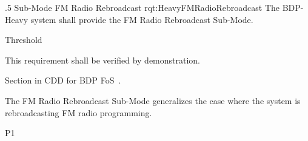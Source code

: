 \ONERQMTVKPP
{\RqtNumberBase.5}
{Sub-Mode FM Radio Rebroadcast}
{rqt:HeavyFMRadioRebroadcast}
{The BDP-Heavy system shall provide the FM Radio Rebroadcast Sub-Mode.}
{
	\item [Phase 1] Threshold
}
{This requirement shall be verified by demonstration.}
{
\item [5.5.5] Section in CDD for BDP FoS~\cite{ref__BDP_FOS_CDD}.
}
{
	\item The FM Radio Rebroadcast Sub-Mode generalizes the case where the system is rebroadcasting FM radio programming.
}
{P1}


